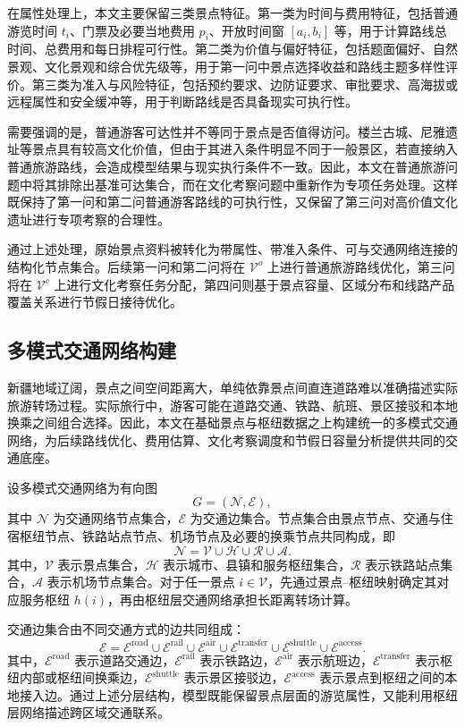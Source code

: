 \documentclass[UTF8,zihao=-4,a4paper]{ctexart}
\begin{document}
在属性处理上，本文主要保留三类景点特征。第一类为时间与费用特征，包括普通游览时间 $t_i$、门票及必要当地费用 $p_i$、开放时间窗 $[a_i,b_i]$ 等，用于计算路线总时间、总费用和每日排程可行性。第二类为价值与偏好特征，包括题面偏好、自然景观、文化景观和综合优先级等，用于第一问中景点选择收益和路线主题多样性评价。第三类为准入与风险特征，包括预约要求、边防证要求、审批要求、高海拔或远程属性和安全缓冲等，用于判断路线是否具备现实可执行性。

需要强调的是，普通游客可达性并不等同于景点是否值得访问。楼兰古城、尼雅遗址等景点具有较高文化价值，但由于其进入条件明显不同于一般景区，若直接纳入普通旅游路线，会造成模型结果与现实执行条件不一致。因此，本文在普通旅游问题中将其排除出基准可达集合，而在文化考察问题中重新作为专项任务处理。这样既保持了第一问和第二问普通游客路线的可执行性，又保留了第三问对高价值文化遗址进行专项考察的合理性。

通过上述处理，原始景点资料被转化为带属性、带准入条件、可与交通网络连接的结构化节点集合。后续第一问和第二问将在 $\mathcal{V}^{o}$ 上进行普通旅游路线优化，第三问将在 $\mathcal{V}^{c}$ 上进行文化考察任务分配，第四问则基于景点容量、区域分布和线路产品覆盖关系进行节假日接待优化。

\subsection{多模式交通网络构建}
\label{subsec:multimodal_network}

新疆地域辽阔，景点之间空间距离大，单纯依靠景点间直连道路难以准确描述实际旅游转场过程。实际旅行中，游客可能在道路交通、铁路、航班、景区接驳和本地换乘之间组合选择。因此，本文在基础景点与枢纽数据之上构建统一的多模式交通网络，为后续路线优化、费用估算、文化考察调度和节假日容量分析提供共同的交通底座。

设多模式交通网络为有向图
\[
G=(\mathcal{N},\mathcal{E}),
\]
其中 $\mathcal{N}$ 为交通网络节点集合，$\mathcal{E}$ 为交通边集合。节点集合由景点节点、交通与住宿枢纽节点、铁路站点节点、机场节点及必要的换乘节点共同构成，即
\[
\mathcal{N}
=
\mathcal{V}
\cup
\mathcal{H}
\cup
\mathcal{R}
\cup
\mathcal{A}.
\]
其中，$\mathcal{V}$ 表示景点集合，$\mathcal{H}$ 表示城市、县镇和服务枢纽集合，$\mathcal{R}$ 表示铁路站点集合，$\mathcal{A}$ 表示机场节点集合。对于任一景点 $i\in\mathcal{V}$，先通过景点--枢纽映射确定其对应服务枢纽 $h(i)$，再由枢纽层交通网络承担长距离转场计算。

交通边集合由不同交通方式的边共同组成：
\[
\mathcal{E}
=
\mathcal{E}^{\mathrm{road}}
\cup
\mathcal{E}^{\mathrm{rail}}
\cup
\mathcal{E}^{\mathrm{air}}
\cup
\mathcal{E}^{\mathrm{transfer}}
\cup
\mathcal{E}^{\mathrm{shuttle}}
\cup
\mathcal{E}^{\mathrm{access}}.
\]
其中，$\mathcal{E}^{\mathrm{road}}$ 表示道路交通边，$\mathcal{E}^{\mathrm{rail}}$ 表示铁路边，$\mathcal{E}^{\mathrm{air}}$ 表示航班边，$\mathcal{E}^{\mathrm{transfer}}$ 表示枢纽内部或枢纽间换乘边，$\mathcal{E}^{\mathrm{shuttle}}$ 表示景区接驳边，$\mathcal{E}^{\mathrm{access}}$ 表示景点到枢纽之间的本地接入边。通过上述分层结构，模型既能保留景点层面的游览属性，又能利用枢纽层网络描述跨区域交通联系。
\end{document}
